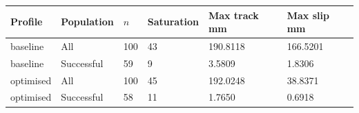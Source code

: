 \begin{tabular}{llllll}
\toprule
Profile & Population & $n$ & Saturation & Max track mm & Max slip mm \\
\midrule
baseline & All & 100 & 43 & 190.8118 & 166.5201 \\
baseline & Successful & 59 & 9 & 3.5809 & 1.8306 \\
optimised & All & 100 & 45 & 192.0248 & 38.8371 \\
optimised & Successful & 58 & 11 & 1.7650 & 0.6918 \\
\bottomrule
\end{tabular}

